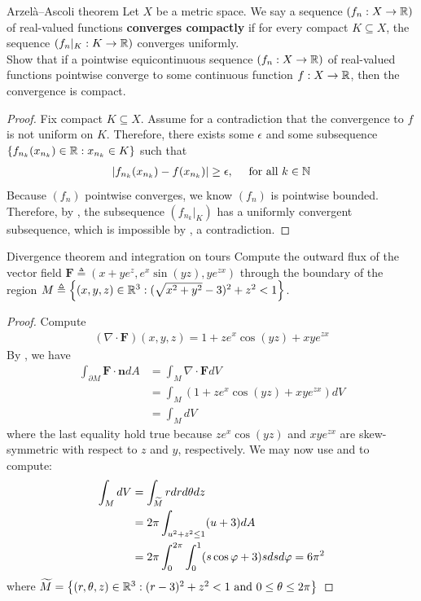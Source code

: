 \documentclass{report}
\begin{document}
\begin{question}{Arzelà–Ascoli theorem}{}
Let $X$ be a metric space. We say a  sequence  $(f_n:X\rightarrow \mathbb{R})$ of real-valued functions \textbf{converges compactly} if for every compact $K \subseteq X$, the sequence $(f_n|_K:K\rightarrow \mathbb{R})$ converges uniformly. \\

Show that if a pointwise equicontinuous sequence $(f_n:X\rightarrow \mathbb{R})$ of real-valued functions pointwise converge to some continuous function $f:X\rightarrow \mathbb{R}$, then the convergence is compact.  
\end{question}
\begin{proof}
Fix compact $K \subseteq X$. Assume for a contradiction that the convergence to $f$ is not uniform on  $K$. Therefore, there exists some $\epsilon $ and some subsequence $\left\{ f_{n_k}(x_{n_k})\in\mathbb{R}: x_{n_k} \in K \right\}$ such that 
\begin{align}
\label{THfnk}
  \left|f_{n_k}(x_{n_k})- f(x_{n_k})\right| \geq \epsilon ,\quad \text{ for all }k \in\mathbb{N} 
\end{align}
Because $(f_n)$ pointwise converges, we know  $(f_n)$ is pointwise bounded. Therefore, by , the subsequence $(f_{n_k}|_K)$ has a uniformly convergent subsequence, which is impossible by , a contradiction. 
\end{proof}
\begin{question}{Divergence theorem and integration on tours}{}
Compute the outward flux of the vector field $\textbf{F}\triangleq (x+ye^z,e^x \sin (yz),ye^{zx})$ through the boundary of the region $M\triangleq \left\{ (x,y,z)\in\mathbb{R}^3: (\sqrt{x^2+y^2}-3 )^2+z^2<1 \right\}$. 
\end{question}
\begin{proof}
Compute 
\begin{align*}
  (\nabla \cdot \textbf{F}) (x,y,z) = 1+ z e^x \cos (yz)+ xye^{zx}
\end{align*}
By , we have 
\begin{align*}
\int_{\partial M} \textbf{F} \cdot \textbf{n} dA &= \int_M \nabla \cdot \textbf{F} dV \\
&= \int_M (1+ze^x \cos (yz)+xye^{zx})dV \\
&= \int_M dV
\end{align*}
where the last equality hold true because $ze^x \cos (yz)$ and $xye^{zx}$ are skew-symmetric with respect to $z$ and $y$, respectively.  We may now use  and   to compute: 
\begin{align*}
\int_M dV&= \int_{\tilde{M}} rdr d\theta dz \\
&= 2\pi \int_{u^2+z^2\leq 1} (u+3) dA  \\
&= 2\pi \int_0^{2\pi }\int_0^1  (s \cos \pfi +3)s dsd\pfi   =6 \pi ^2
\end{align*}
where $\widetilde{M}=\left\{ (r,\theta ,z)\in\mathbb{R}^3: (r-3)^2 + z^2<1 \text{ and }0\leq \theta \leq 2\pi  \right\}$
\end{proof}
\end{document}
